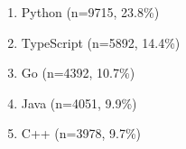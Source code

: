 \begin{enumerate}
  \item Python (n=9715, 23.8\%)
  \item TypeScript (n=5892, 14.4\%)
  \item Go (n=4392, 10.7\%)
  \item Java (n=4051, 9.9\%)
  \item C++ (n=3978, 9.7\%)
\end{enumerate}
